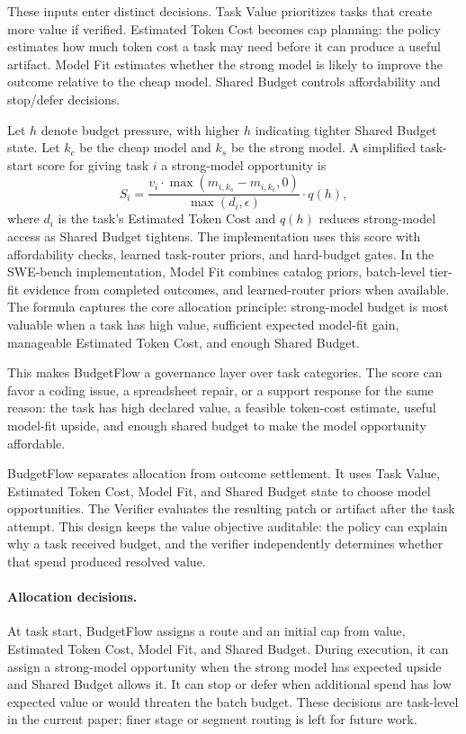 \documentclass[sigconf,review,anonymous]{acmart}
\newcommand{\method}{BudgetFlow\xspace}
\newcommand{\taskvalue}{Task Value\xspace}
\newcommand{\tokencost}{Estimated Token Cost\xspace}
\newcommand{\modelfit}{Model Fit\xspace}
\newcommand{\sharedbudget}{Shared Budget\xspace}
\newcommand{\verifier}{Verifier\xspace}
\begin{document}
These inputs enter distinct decisions. \taskvalue prioritizes tasks that create more value if verified. \tokencost becomes cap planning: the policy estimates how much token cost a task may need before it can produce a useful artifact. \modelfit estimates whether the strong model is likely to improve the outcome relative to the cheap model. \sharedbudget controls affordability and stop/defer decisions.

Let $h$ denote budget pressure, with higher $h$ indicating tighter \sharedbudget state. Let $k_c$ be the cheap model and $k_s$ be the strong model. A simplified task-start score for giving task $i$ a strong-model opportunity is
\[
    S_i =
    \frac{v_i \cdot \max(m_{i,k_s}-m_{i,k_c},0)}
    {\max(d_i,\epsilon)}
    \cdot q(h),
\]
where $d_i$ is the task's \tokencost and $q(h)$ reduces strong-model access as \sharedbudget tightens. The implementation uses this score with affordability checks, learned task-router priors, and hard-budget gates. In the SWE-bench implementation, \modelfit combines catalog priors, batch-level tier-fit evidence from completed outcomes, and learned-router priors when available. The formula captures the core allocation principle: strong-model budget is most valuable when a task has high value, sufficient expected model-fit gain, manageable \tokencost, and enough \sharedbudget.

This makes \method a governance layer over task categories. The score can favor a coding issue, a spreadsheet repair, or a support response for the same reason: the task has high declared value, a feasible token-cost estimate, useful model-fit upside, and enough shared budget to make the model opportunity affordable.

\method separates allocation from outcome settlement. It uses \taskvalue, \tokencost, \modelfit, and \sharedbudget state to choose model opportunities. The \verifier evaluates the resulting patch or artifact after the task attempt. This design keeps the value objective auditable: the policy can explain why a task received budget, and the verifier independently determines whether that spend produced resolved value.

\paragraph{Allocation decisions.}
At task start, \method assigns a route and an initial cap from value, \tokencost, \modelfit, and \sharedbudget. During execution, it can assign a strong-model opportunity when the strong model has expected upside and \sharedbudget allows it. It can stop or defer when additional spend has low expected value or would threaten the batch budget. These decisions are task-level in the current paper; finer stage or segment routing is left for future work.
\end{document}
